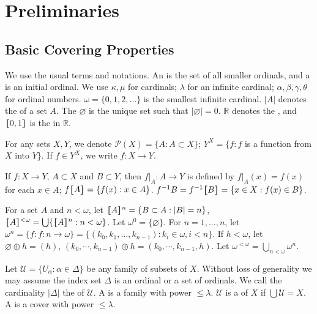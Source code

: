 \documentclass[main.tex]{subfiles}
\begin{document}
\chapter{Preliminaries} 
\label{chap1}

\section{Basic Covering Properties}  
\label{sec:1.1}

We use the  usual terms and notations. 
An  
is the set of all smaller ordinals, 
and a  
is an initial ordinal. 
We use $\kappa, \mu$ for cardinals; $\lambda$
for an infinite cardinal;  $\alpha, \beta, \gamma, \theta$ for ordinal numbers. $\omega = \{0, 1, 2, \dots\}$ is the smallest infinite cardinal. 
$|A|$ denotes the  
of a set $A$.
The   $\varnothing$ is the unique set  such that 
$|\varnothing| = 0$.
$\mathbb{R}$ denotes the  
,
and $\hstretch{1.8}{[}0, 1\hstretch{1.8}{]}$ is the   
in $\mathbb{R}$.

For any sets $X, Y$, we denote 
$\mathscr{P}(X) = \{A: A \subset{X}\}$; 
$Y^X= \{f: f$  is a function from $X$  into $Y$\}. 
If $f \in Y^X$, we write $f: X \to Y$.

If $f: X \to Y$, $A \subset X$ and $B \subset Y$, then $f|_A: A \to Y$
is defined by $f|_A(x) = f(x)$ for each $x \in A$; 
$f\hstretch{1.8}{[}A\hstretch{1.8}{]} = \{f(x): x \in A\}$. $f^{-1}B = f^{-1}\hstretch{1.8}{[}B\hstretch{1.8}{]} = \{x \in X: f(x) \in B\}$.

For a set $A$ and $n < \omega$,
let $\hstretch{1.8}{[}A\hstretch{1.8}{]}^{n} = \{ B \subset A: | B| = n \}$,
$\hstretch{1.8}{[}A\hstretch{1.8}{]}^{< \omega} = \bigcup \{ \hstretch{1.8}{[}A\hstretch{1.8}{]}^{n}: n < \omega \}$. 
Let $ \omega^0 = \{ \varnothing \}$. For  $n = 1, \dots, n$, let
$\omega^n = \{ f: f: n \to \omega \} = \{ ( k_{0}, k_{1}, \dots, k_{n-1} ):  k_i \in\omega, i < n\} $.
If $h < \omega$, let $\varnothing\oplus h = (h)$, 
$(k_0, \cdots, k_{n-1})\oplus h = (k_0, \cdots, k_{n-1}, h)$.	
Let $\omega^{<\omega} = \bigcup_{n<\omega}\omega^{n}$.

Let  $\mathscr{U} = \{ U_\alpha: \alpha\in \Delta\} $ be any family of subsets of  $X$. 
Without loss of generality we may assume the index set  $ \Delta $ is an ordinal or a set of ordinals. We call
the cardinality $|\Delta|$ the 
of $\mathscr{U}$. A 
is a family with power $\le \lambda$. $\mathscr{U}$ is a 
of $X$ if $\bigcup \mathscr{U} = X$. A 
is a cover with power $\le \lambda$.
\end{document}
